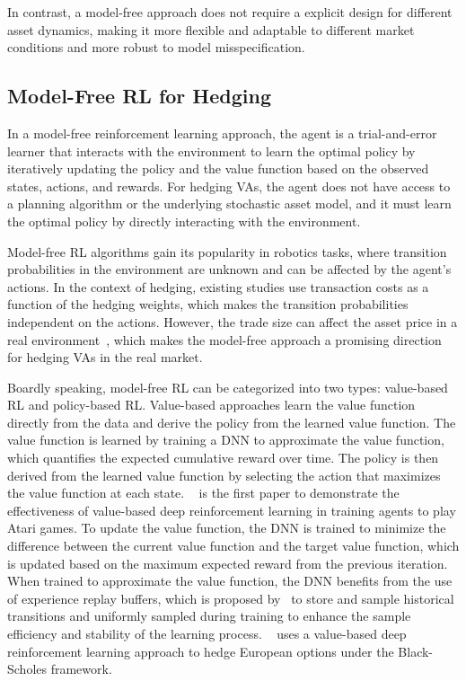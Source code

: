 In contrast, a model-free approach does not require a explicit design for different asset dynamics, making it more flexible and adaptable to different market conditions and more robust to model misspecification.

\subsection{Model-Free RL for Hedging}
    
In a model-free reinforcement learning approach, the agent is a trial-and-error learner that interacts with the environment to learn the optimal policy by iteratively updating the policy and the value function based on the observed states, actions, and rewards.
For hedging VAs, the agent does not have access to a planning algorithm or the underlying stochastic asset model, and it must learn the optimal policy by directly interacting with the environment.

Model-free RL algorithms gain its popularity in robotics tasks, where transition probabilities in the environment are unknown and can be affected by the agent's actions.
In the context of hedging, existing studies use transaction costs as a function of the hedging weights, which makes the transition probabilities independent on the actions.
However, the trade size can affect the asset price in a real environment~\citep{hasbrouck1991measuring}, which makes the model-free approach a promising direction for hedging VAs in the real market.

Boardly speaking, model-free RL can be categorized into two types: value-based RL and policy-based RL.
Value-based approaches learn the value function directly from the data and derive the policy from the learned value function. 
The value function is learned by training a DNN to approximate the value function, which quantifies the expected cumulative reward over time. 
The policy is then derived from the learned value function by selecting the action that maximizes the value function at each state. 
~\cite{mnih2015human} is the first paper to demonstrate the effectiveness of value-based deep reinforcement learning in training agents to play Atari games.
To update the value function, the DNN is trained to minimize the difference between the current value function and the target value function, which is updated based on the maximum expected reward from the previous iteration.
When trained to approximate the value function, the DNN benefits from the use of experience replay buffers, which is proposed by~\cite{lin1992self} to store and sample historical transitions and uniformly sampled during training to enhance the sample efficiency and stability of the learning process.
~\cite{kolm2019dynamic} uses a value-based deep reinforcement learning approach to hedge European options under the Black-Scholes framework.

